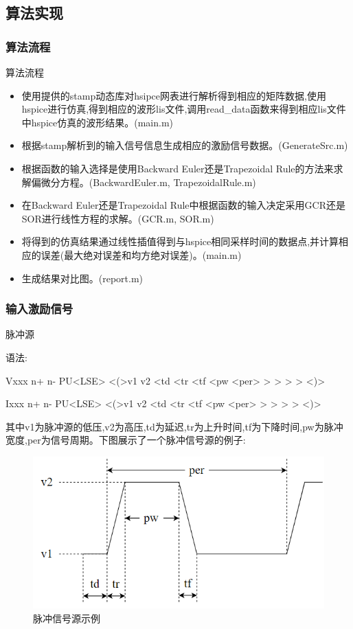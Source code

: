 \documentclass[12pt]{article}
\begin{document}
\begin{sloppypar}
\subsection{算法实现}

\subsubsection{算法流程}
\qquad 算法流程
\begin{itemize}
  \item 使用提供的stamp动态库对hsipce网表进行解析得到相应的矩阵数据,使用hspice进行仿真,得到相应的波形lis文件,调用read_data函数来得到相应lis文件中hspice仿真的波形结果。(main.m)
  \item 根据stamp解析到的输入信号信息生成相应的激励信号数据。(GenerateSrc.m)
  \item 根据函数的输入选择是使用Backward Euler还是Trapezoidal Rule的方法来求解偏微分方程。(BackwardEuler.m, TrapezoidalRule.m)
  \item 在Backward Euler还是Trapezoidal Rule中根据函数的输入决定采用GCR还是SOR进行线性方程的求解。(GCR.m, SOR.m)
  \item 将得到的仿真结果通过线性插值得到与hspice相同采样时间的数据点,并计算相应的误差(最大绝对误差和均方绝对误差)。(main.m)
  \item 生成结果对比图。(report.m)
\end{itemize}


\subsubsection{输入激励信号}
\qquad 脉冲源

\qquad 语法:

\qquad Vxxx n+ n- PU<LSE> <(>v1 v2 <td <tr <tf <pw <per> > > > > <)>

\qquad Ixxx n+ n- PU<LSE> <(>v1 v2 <td <tr <tf <pw <per> > > > > <)>

\qquad 其中v1为脉冲源的低压,v2为高压,td为延迟,tr为上升时间,tf为下降时间,pw为脉冲宽度,per为信号周期。下图展示了一个脉冲信号源的例子:

\begin{figure}[H]
  \centering
  \includegraphics[width=0.5\columnwidth]{figure/pulse.png}
  \caption{脉冲信号源示例}
\end{figure}


\end{sloppypar}
\end{document}
